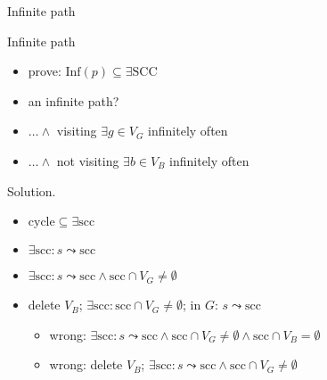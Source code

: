 \begin{frame}{Infinite path}
  \begin{exampleblock}{Infinite path }
    \begin{itemize}
      \item prove: $\text{Inf}(p) \subseteq \exists \text{SCC}$
      \item an infinite path?
      \item $\ldots \land$ visiting $\exists g \in V_{G}$ infinitely often
      \item $\ldots \land$ not visiting $\exists b \in V_{B}$ infinitely often
    \end{itemize}
  \end{exampleblock}

  \begin{block}{Solution.}
    \begin{itemize}
      \item $\text{cycle} \subseteq \exists \text{scc}$
      \item $\exists \text{scc}: s \leadsto \text{scc}$
      \item $\exists \text{scc}: s \leadsto \text{scc} \land \text{scc} \cap V_{G} \neq \emptyset$
      \item delete $V_{B}$; $\exists \text{scc}: \text{scc} \cap V_{G} \neq \emptyset$; in $G$: $s \leadsto \text{scc}$
	\begin{itemize}
	  \item wrong: $\exists \text{scc}: s \leadsto \text{scc} \land \text{scc} \cap V_{G} \neq \emptyset \land \text{scc} \cap V_{B} = \emptyset$
	  \item wrong: delete $V_{B}$; $\exists \text{scc}: s \leadsto \text{scc} \land \text{scc} \cap V_{G} \neq \emptyset$
	\end{itemize}
    \end{itemize}
  \end{block}
\end{frame}
